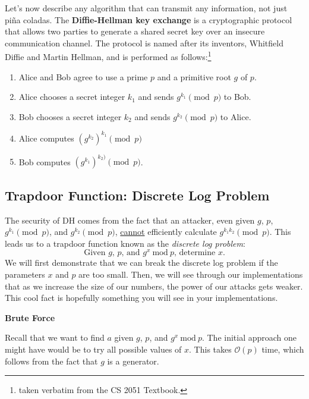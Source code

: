 \documentclass{article}
\begin{document}
    \vspace{3mm}
    Let's now describe any algorithm that can transmit any information, not just piña coladas. The \textbf{Diffie-Hellman key exchange} is a cryptographic protocol that allows two parties to generate a shared secret key over an insecure communication channel. The protocol is named after its inventors, Whitfield Diffie and Martin Hellman, and is performed as follows:\footnote{taken verbatim from the CS 2051 Textbook.}
    \begin{enumerate}[label = \arabic*]
        \item Alice and Bob agree to use a prime $p$ and a primitive root $g$ of $p$.
        \item Alice chooses a secret integer $k_{1}$ and sends $g^{k_{1}} \pmod{p}$ to Bob.
        \item Bob chooses a secret integer $k_{2}$ and sends $g^{k_{2}} \pmod{p}$ to Alice.
        \item Alice computes $(g^{k_{2}})^{k_{1}} \pmod{p}$
        \item Bob computes $(g^{k_{1}})^{k_{2})}\pmod{p}$.
    \end{enumerate}

\subsection*{Trapdoor Function: Discrete Log Problem}
    The security of DH comes from the fact that an attacker, even given $g$, $p$, $g^{k_{1}} \pmod{p}$, and $g^{k_{2}} \pmod{p}$, \underline{cannot} efficiently calculate $g^{k_{1} k_{2}} \pmod{p}$. This leads us to a trapdoor function known as the \textit{discrete log problem}: $$\text{Given $g$, $p$, and $g^{x}\ \text{mod}\ p$, determine $x$}.$$ We will first demonstrate that we can break the discrete log problem if the parameters $x$ and $p$ are too small. Then, we will see through our implementations that as we increase the size of our numbers, the power of our attacks gets weaker. This cool fact is hopefully something you will see in your implementations.

    \begin{center}
        \textbf{Brute Force}
    \end{center}

    Recall that we want to find $a$ given $g$, $p$, and $g^{x}\ \text{mod}\ p$. The initial approach one might have would be to try all possible values of $x$. This takes $\mathcal{O}(p)$ time, which follows from the fact that $g$ is a generator.
    
\end{document}
